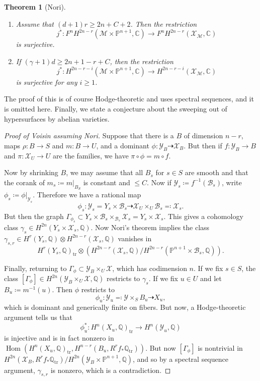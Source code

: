 \documentclass{amsart}
\newtheorem{thm}{Theorem}[section]
\theoremstyle{definition}
\theoremstyle{remark}
\theoremstyle{plain}
\theoremstyle{definition}
\theoremstyle{remark}
\newcommand{\C}{\mathbb{C}}
\newcommand{\Q}{\mathbb{Q}}
\renewcommand{\P}{\mathbb{P}}
\newcommand{\mc}[1]{\mathcal{#1}}
\newcommand{\mr}[1]{\mathrm{#1}}
\newcommand{\1}{\mathbf{1}}
\newcommand{\2}{\mathbf{2}}
\newcommand{\3}{\mathbf{3}}
\DeclareMathOperator{\Hom}{Hom}
\begin{document}
\begin{thm}[Nori]\leavevmode
    \begin{enumerate}
        \item Assume that $(d+1)r \geq 2n+C+2$. Then the restriction
            \[ j^* \colon F^n H^{2n-r}(\mc{M} \times \P^{n+1}, \C) \to F^n H^{2n-r}(\mc{X}_{\mc{M}}, \C) \]
            is surjective.
        \item If $(\gamma + 1) d \geq 2n+1-r+C$, then the restriction
            \[ j^* \colon H^{2n-r-i}(\mc{M} \times \P^{n+1}, \C) \to H^{2n-r-i}(\mc{X}_{\mc{M}}, \C) \]
            is surjective for any $i \geq 1$.
    \end{enumerate}
\end{thm}

The proof of this is of course Hodge-theoretic and uses spectral sequences, and it is omitted here. Finally, we state a conjecture about the sweeping out of hypersurfaces by abelian varieties.

\begin{proof}[Proof of Voisin assuming Nori]
    Suppose that there is a $B$ of dimension $n-r$, maps $\rho \colon B \to S$ and $m \colon B \to U$, and a dominant $\phi \colon \mc{Y}_B \dashrightarrow \mc{X}_B$. But then if $f \colon \mc{Y}_B \to B$ and $\pi \colon \mc{X}_U \to U$ are the families, we have $\pi \circ \phi = m \circ f$.

    Now by shrinking $B$, we may assume that all $B_s$ for $s \in S$ are smooth and that the corank of $m_s \coloneqq m |_{B_S}$ is constant and $\leq C$. Now if $\mc{Y}_s \coloneqq f^{-1}(\mc{B}_s)$, write $\phi_s \coloneqq \phi |_{\mc{Y}_s}$. Therefore we have a rational map
    \[ \phi_s \colon \mc{Y}_s = Y_s \times \mc{B}_s \dashrightarrow \mc{X}_U \times_U \mc{B}_s \eqqcolon \mc{X}_s. \]
    But then the graph $\Gamma_{\phi_s} \subset Y_s \times \mc{B}_s \times_{\mc{B}_s} \mc{X}_s = Y_s \times \mc{X}_s$. This gives a cohomology class $\gamma_s \in H^{2n}(Y_s \times \mc{X}_s, \Q)$. Now Nori's theorem implies the class $\gamma_{s, r} \in H^r(Y_s, \Q) \otimes H^{2n-r}(\mc{X}_s, \Q)$ vanishes in 
    \[ H^r(Y_s, \Q)_{\mr{tr}} \otimes (H^{2n-r}(\mc{X}_s, \Q) / H^{2n-r}(\P^{n+1} \times \mc{B}_s, \Q)). \]

    Finally, returning to $\Gamma_{\phi} \subset \mc{Y}_B \times_U \mc{X}$, which has codimension $n$. If we fix $s \in S$, the class $[\Gamma_{\phi}] \in H^{2n}(\mc{Y}_B \times_U \mc{X}, \Q)$ restricts to $\gamma_s$. If we fix $u \in U$ and let $B_u \coloneqq m^{-1}(u)$. Then $\phi$ restricts to
    \[ \phi_u \colon \mc{Y}_u \eqqcolon \mc{Y} \times_S B_u \dashrightarrow X_u, \]
    which is dominant and generically finite on fibers. But now, a Hodge-theoretic argument tells us that
    \[ \phi_u^* \colon H^n(X_u, \Q)_{\mr{tr}} \to H^n(\mc{Y}_u, \Q) \]
    is injective and is in fact nonzero in $\Hom(H^n(X_u, \Q)_{\mr{tr}}, H^{n-r}(B_u, R^r f_* \Q_{\mr{tr}}))$. But now $[\Gamma_{\phi}]$ is nontrivial in $H^{2n}(\mc{X}_B, R^r f_* \Q_{\mr{tr}}) / H^{2n}(\mc{Y}_B \times \P^{n+1}, \Q)$, and so by a spectral sequence argument, $\gamma_{s,r}$ is nonzero, which is a contradiction.
\end{proof}
\end{document}
